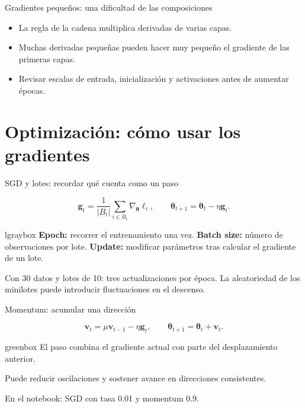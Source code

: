 \documentclass[10pt,aspectratio=169,xcolor={dvipsnames}]{beamer}
\newenvironment{caja}[1][lgraybox]{\begin{beamercolorbox}[sep=0.7em,wd=\linewidth]{#1}}{\end{beamercolorbox}}
\begin{document}
\begin{frame}{Gradientes pequeños: una dificultad de las composiciones}
\begin{itemize}
\item La regla de la cadena multiplica derivadas de varias capas.
\item Muchas derivadas pequeñas pueden hacer muy pequeño el gradiente de las primeras capas.
\item Revisar escalas de entrada, inicialización y activaciones antes de aumentar épocas.
\end{itemize}
\end{frame}

\section{Optimización: cómo usar los gradientes}
\begin{frame}{SGD y lotes: recordar qué cuenta como un paso}

\[\bm g_t=\frac1{|B_t|}\sum_{i\in B_t}\nabla_{\bm\theta}\ell_i,
\qquad\bm\theta_{t+1}=\bm\theta_t-\eta\bm g_t.\]
\begin{caja}
\textbf{Epoch:} recorrer el entrenamiento una vez.
\textbf{Batch size:} número de observaciones por lote.
\textbf{Update:} modificar parámetros tras calcular el gradiente de un lote.
\end{caja}
Con 30 datos y lotes de 10: tres actualizaciones por época.
La aleatoriedad de los minilotes puede introducir fluctuaciones en el descenso.
\note{}
\end{frame}

\begin{frame}{Momentum: acumular una dirección}

\[\bm v_t=\mu\bm v_{t-1}-\eta\bm g_t,\qquad
\bm\theta_{t+1}=\bm\theta_t+\bm v_t.\]
\begin{caja}[greenbox]
El paso combina el gradiente actual con parte del desplazamiento anterior.
\end{caja}
Puede reducir oscilaciones y sostener avance en direcciones consistentes.
\par\medskip En el notebook: SGD con tasa 0.01 y momentum 0.9.
\end{frame}
\end{document}
